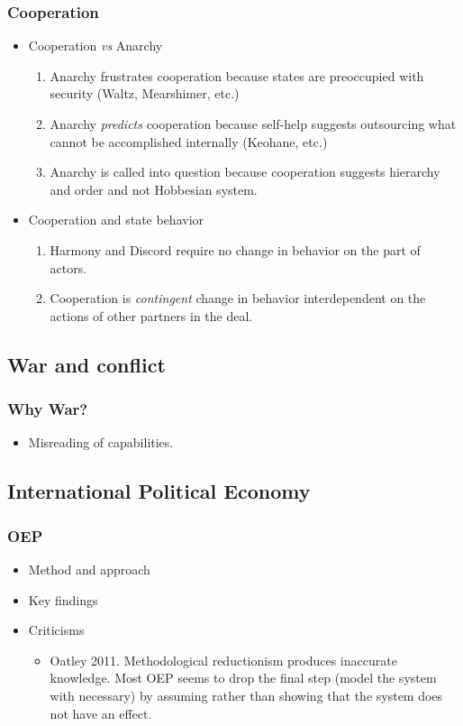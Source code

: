 \documentclass[11pt]{article}
\begin{document}
\subsubsection{Cooperation}
\label{sec-1-1-6}
\begin{itemize}
\item Cooperation \emph{vs} Anarchy
\label{sec-1-1-6-1}
\begin{enumerate}
\item Anarchy frustrates cooperation because states are preoccupied with
security (Waltz, Mearshimer, etc.)
\item Anarchy \emph{predicts} cooperation because self-help suggests
outsourcing what cannot be accomplished internally (Keohane, etc.)
\item Anarchy is called into question because cooperation suggests
hierarchy and order and not Hobbesian system.
\end{enumerate}
\item Cooperation and state behavior
\label{sec-1-1-6-2}
\begin{enumerate}
\item Harmony and Discord require no change in behavior on the part of actors.
\item Cooperation is \emph{contingent} change in behavior interdependent on
the actions of other partners in the deal.
\end{enumerate}
\end{itemize}

\subsection{War and conflict}
\label{sec-1-2}
\subsubsection{Why War?}
\label{sec-1-2-1}
\begin{itemize}
\item Misreading of capabilities.
\label{sec-1-2-1-1}
\end{itemize}
\subsection{International Political Economy}
\label{sec-1-3}
\subsubsection{OEP}
\label{sec-1-3-1}
\begin{itemize}
\item Method and approach
\label{sec-1-3-1-1}
\item Key findings
\label{sec-1-3-1-2}
\item Criticisms
\label{sec-1-3-1-3}
\begin{itemize}
\item Oatley 2011.
\label{sec-1-3-1-3-1}
Methodological reductionism produces inaccurate knowledge. Most OEP
seems to drop the final step (model the system with necessary) by
assuming rather than showing that the system does not have an effect.
\end{itemize}
\end{itemize}
\end{document}
